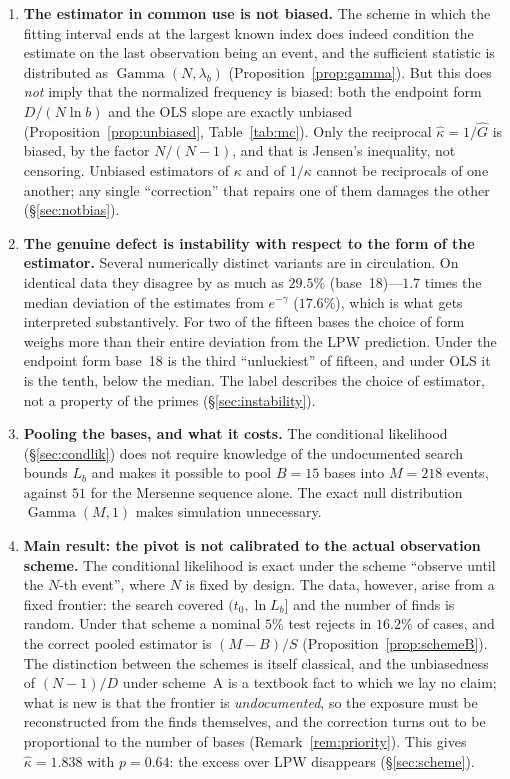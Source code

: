 \documentclass[11pt,a4paper]{article}
\theoremstyle{plain}
\theoremstyle{remark}
\newcommand{\emg}{e^{-\gamma}}
\DeclareMathOperator{\Gam}{Gamma}
\begin{document}
\begin{enumerate}
\item\textbf{The estimator in common use is not biased.} The scheme in which the
fitting interval ends at the largest known index does indeed condition the
estimate on the last observation being an event, and the sufficient statistic is
distributed as $\Gam(N,\lambda_b)$ (Proposition~\ref{prop:gamma}). But this does
\emph{not} imply that the normalized frequency is biased: both the endpoint form
$D/(N\ln b)$ and the OLS slope are exactly unbiased
(Proposition~\ref{prop:unbiased}, Table~\ref{tab:mc}). Only the reciprocal
$\hat\kappa=1/\hat G$ is biased, by the factor $N/(N-1)$, and that is Jensen's
inequality, not censoring. Unbiased estimators of $\kappa$ and of $1/\kappa$
cannot be reciprocals of one another; any single ``correction'' that repairs one
of them damages the other (\S\ref{sec:notbias}).

\item\textbf{The genuine defect is instability with respect to the form of the
estimator.} Several numerically distinct variants are in circulation. On
identical data they disagree by as much as $29.5\%$ (base~18)---$1.7$ times the
median deviation of the estimates from $\emg$ ($17.6\%$), which is what gets
interpreted substantively. For two of the fifteen bases the choice of form
weighs more than their entire deviation from the LPW prediction. Under the
endpoint form base~18 is the third ``unluckiest'' of fifteen, and under OLS it is
the tenth, below the median. The label describes the choice of estimator, not a
property of the primes (\S\ref{sec:instability}).

\item\textbf{Pooling the bases, and what it costs.} The conditional likelihood
(\S\ref{sec:condlik}) does not require knowledge of the undocumented search
bounds $L_b$ and makes it possible to pool $B=15$ bases into $M=218$ events,
against $51$ for the Mersenne sequence alone. The exact null distribution
$\Gam(M,1)$ makes simulation unnecessary.

\item\textbf{Main result: the pivot is not calibrated to the actual observation
scheme.} The conditional likelihood is exact under the scheme ``observe until
the $N$-th event'', where $N$ is fixed by design. The data, however, arise from
a fixed frontier: the search covered $(t_0,\ln L_b]$ and the number of finds is
random. Under that scheme a nominal $5\%$ test rejects in $16.2\%$ of cases, and
the correct pooled estimator is $(M-B)/S$ (Proposition~\ref{prop:schemeB}). The
distinction between the schemes is itself classical, and the unbiasedness of
$(N-1)/D$ under scheme~A is a textbook fact to which we lay no claim; what is
new is that the frontier is \emph{undocumented}, so the exposure must be
reconstructed from the finds themselves, and the correction turns out to be
proportional to the number of bases (Remark~\ref{rem:priority}). This gives
$\hat\kappa=1.838$ with $p=0.64$: the excess over LPW disappears
(\S\ref{sec:scheme}).


\end{enumerate}
\end{document}

